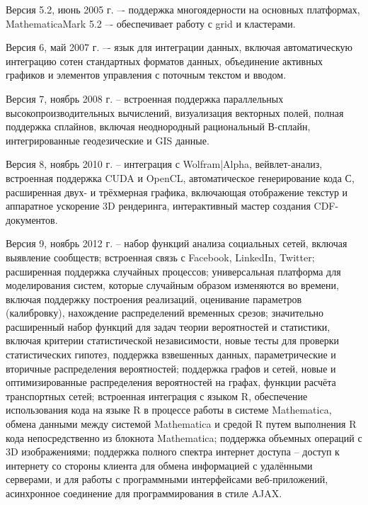 \begin{textitemize}
	\item Версия 5.2, июнь 2005 г. –- поддержка многоядерности на основных платформах, MathematicaMark 5.2 –- обеспечивает работу с grid и кластерами.
	\item Версия 6, май 2007 г. –- язык для интеграции данных, включая автоматическую интеграцию сотен стандартных форматов данных, объединение активных графиков и элементов управления с поточным текстом и вводом.
	\item Версия 7, ноябрь 2008 г. -- встроенная поддержка параллельных высокопроизводительных вычислений, визуализация векторных полей, полная поддержка сплайнов, включая неоднородный рациональный В-сплайн, интегрированные геодезические и GIS данные.
	\item Версия 8, ноябрь 2010 г. -- интеграция с Wolfram|Alpha, вейвлет-анализ, встроенная поддержка CUDA и OpenCL, автоматическое генерирование кода С, расширенная двух- и трёхмерная графика, включающая отображение текстур и аппаратное ускорение 3D рендеринга, интерактивный мастер создания CDF-документов.
	\item Версия 9, ноябрь 2012 г. -- набор функций анализа социальных сетей, включая выявление сообществ; встроенная связь с Facebook, LinkedIn, Twitter; расширенная поддержка случайных процессов; универсальная платформа для моделирования систем, которые случайным образом изменяются во времени, включая поддержку построения реализаций, оценивание параметров (калибровку), нахождение распределений временных срезов; значительно расширенный набор функций для задач теории вероятностей и статистики, включая критерии статистической независимости, новые тесты для проверки статистических гипотез, поддержка взвешенных данных, параметрические и вторичные распределения вероятностей; поддержка графов и сетей, новые и оптимизированные распределения вероятностей на графах, функции расчёта транспортных сетей; встроенная интеграция с языком R, обеспечение использования кода на языке R в процессе работы в системе Mathematica, обмена данными между системой Mathematica и средой R путем выполнения R кода непосредственно из блокнота Mathematica; поддержка объемных операций с 3D изображениями; поддержка полного спектра интернет доступа -- доступ к интернету со стороны клиента для обмена информацией с удалёнными серверами, и для работы с программными интерфейсами веб-приложений, асинхронное соединение для программирования в стиле AJAX.

\end{textitemize}
